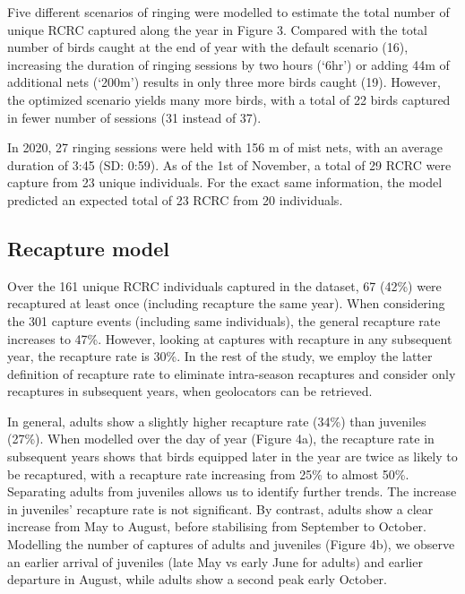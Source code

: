 \documentclass[]{interact}
\theoremstyle{plain}%
\theoremstyle{definition}
\theoremstyle{remark}
\begin{document}
Five different scenarios of ringing were modelled to estimate the total
number of unique RCRC captured along the year in Figure 3. Compared with
the total number of birds caught at the end of year with the default
scenario (16), increasing the duration of ringing sessions by two hours
(`6hr') or adding 44m of additional nets (`200m') results in only three
more birds caught (19). However, the optimized scenario yields many more
birds, with a total of 22 birds captured in fewer number of sessions (31
instead of 37).

In 2020, 27 ringing sessions were held with 156 m of mist nets, with an
average duration of 3:45 (SD: 0:59). As of the 1st of November, a total
of 29 RCRC were capture from 23 unique individuals. For the exact same
information, the model predicted an expected total of 23 RCRC from 20
individuals.

\hypertarget{recapture-model-1}{%
\subsection{Recapture model}\label{recapture-model-1}}

Over the 161 unique RCRC individuals captured in the dataset, 67 (42\%)
were recaptured at least once (including recapture the same year). When
considering the 301 capture events (including same individuals), the
general recapture rate increases to 47\%. However, looking at captures
with recapture in any subsequent year, the recapture rate is 30\%. In
the rest of the study, we employ the latter definition of recapture rate
to eliminate intra-season recaptures and consider only recaptures in
subsequent years, when geolocators can be retrieved.

In general, adults show a slightly higher recapture rate (34\%) than
juveniles (27\%). When modelled over the day of year (Figure 4a), the
recapture rate in subsequent years shows that birds equipped later in
the year are twice as likely to be recaptured, with a recapture rate
increasing from 25\% to almost 50\%. Separating adults from juveniles
allows us to identify further trends. The increase in juveniles'
recapture rate is not significant. By contrast, adults show a clear
increase from May to August, before stabilising from September to
October. Modelling the number of captures of adults and juveniles
(Figure 4b), we observe an earlier arrival of juveniles (late May vs
early June for adults) and earlier departure in August, while adults
show a second peak early October.
\end{document}
